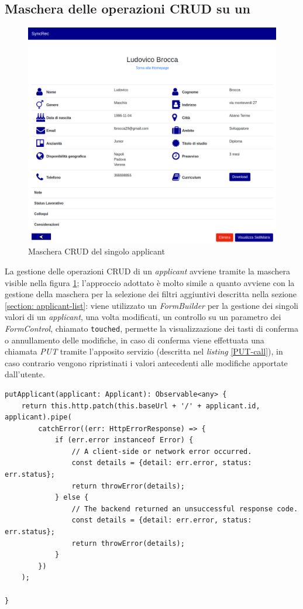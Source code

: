 \subsection{Maschera delle operazioni CRUD su un\applicant}\label{m-CRUD}
\vspace{0.5em}
\begin{figure}[!h] 
	\centering 
	\includegraphics[width=1\columnwidth]{immagini/svil/applicant}
	\caption{Maschera CRUD del singolo applicant}
	\label{figura:applicant}
\end{figure}
La gestione delle operazioni \gls{CRUD} di un \textit{applicant} avviene tramite la maschera visible nella figura \ref{figura:applicant}; l'approccio adottato è molto simile a quanto avviene con la gestione della maschera per la selezione dei filtri aggiuntivi descritta nella sezione \ref{section: applicant-list}: viene utilizzato un \textit{FormBuilder} per la gestione dei singoli valori di un \textit{applicant}, una volta modificati, un controllo su un parametro dei \textit{FormControl}, chiamato \texttt{touched}, permette la visualizzazione dei tasti di conferma o annullamento delle modifiche, in caso di conferma viene effettuata una chiamata \textit{PUT} tramite l'apposito servizio (descritta nel \textit{listing} \ref{PUT-call}), in caso contrario vengono ripristinati i valori antecedenti alle modifiche apportate dall'utente.\\
\newpage
\begin{lstlisting}[label=PUT-call, caption=chiamata PUT al microservizio del Back-end di SyncRec]
putApplicant(applicant: Applicant): Observable<any> {
	return this.http.patch(this.baseUrl + '/' + applicant.id, applicant).pipe(
		catchError((err: HttpErrorResponse) => {
			if (err.error instanceof Error) {
				// A client-side or network error occurred.
				const details = {detail: err.error, status: err.status};
				return throwError(details);
			} else {
				// The backend returned an unsuccessful response code.
				const details = {detail: err.error, status: err.status};
				return throwError(details);
			}
		})
	);
	
}
\end{lstlisting}
